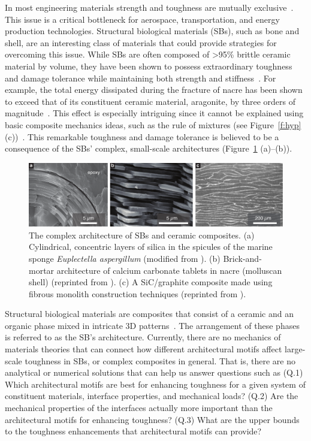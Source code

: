 \documentclass[10pt,letterpaper]{article}
\begin{document}
    In most engineering materials strength and toughness are mutually exclusive~\cite{ritchie2011conflicts}. This issue is a critical bottleneck for aerospace, transportation, and energy production technologies. Structural biological materials (SBs), such as bone and shell, are an interesting class of materials that could provide strategies for overcoming this issue. While SBs are often composed of >95\% brittle ceramic material by volume, they have been shown to possess extraordinary toughness and damage tolerance while maintaining both strength and stiffness~\cite{barthelat2011toughness,rabiei2012nacre,currey2003well,wang2001deformation}. For example, the total energy dissipated during the fracture of nacre has been shown to exceed that of its constituent ceramic material, aragonite, by three orders of magnitude~\cite{currey1976further,Currey:1977wf}.  This effect is especially intriguing since it cannot be explained using basic composite mechanics ideas, such as the rule of mixtures (see Figure~\ref{f:hyp} (c))~\cite{wegst2015bioinspired}. This remarkable toughness and damage tolerance is believed to be a consequence of the SBs' complex, small-scale architectures (Figure~\ref{f:intro} (a)--(b)).
%
    \begin{figure}[h!]
      \centering
        \includegraphics[width=\textwidth, trim={0 0.0cm 0.0cm 0}, clip]{Figures/Introduction/IntroFig_V7.pdf}
        \caption{ \footnotesize The complex architecture of SBs and ceramic composites. (a) Cylindrical, concentric layers of silica in the spicules of the marine sponge \textit{Euplectella aspergillum} (modified from \cite{monn2015new}). (b) Brick-and-mortar architecture of calcium carbonate tablets in nacre (molluscan shell) (reprinted from \cite{ritchie2011conflicts}). (c) A SiC/graphite composite made using fibrous monolith construction techniques (reprinted from \cite{baskaran1993fibrous}).
          }
        \label{f:intro}
      \end{figure}
%
    Structural biological materials are composites that consist of a ceramic and an organic phase mixed in intricate 3D patterns~\cite{mayer2005rigid,meyers2013structural}. The arrangement of these phases is referred to as the SB's architecture.  Currently, there are no mechanics of materials theories that can connect how different architectural motifs affect large-scale toughness in SBs, or complex composites in general. That is, there are no analytical or numerical solutions that can help us  answer questions such as (Q.1) Which architectural motifs are best for enhancing toughness for a given system of constituent materials, interface properties, and mechanical loads? (Q.2) Are the mechanical properties of the interfaces actually more important than the architectural motifs for enhancing toughness? (Q.3) What are the upper bounds to the toughness enhancements that architectural motifs can provide?
\end{document}
